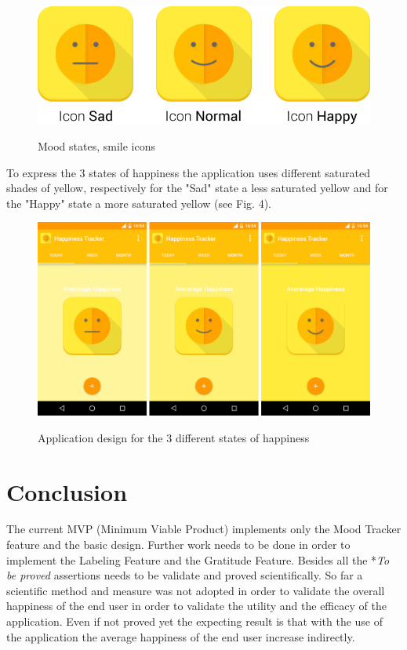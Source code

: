 \documentclass[times]{jtitauth}
\begin{document}
\begin{figure}[H]
\includegraphics[width=\columnwidth]{HappinessTracker-smile-icons}
\label{fig:smile-icons}
\centering
\caption{Mood states, smile icons}
\end{figure}

To express the 3 states of happiness the application uses different saturated shades
of yellow, respectively for the "Sad" state a less saturated yellow and for the
"Happy" state a more saturated yellow (see Fig. 4).

\begin{figure}[H]
\includegraphics[width=\columnwidth]{HappinessTracker-happiness-types}
\label{fig:happiness-types}
\centering
\caption{Application design for the 3 different states of happiness}
\end{figure}

\section*{Conclusion}
The current MVP (Minimum Viable Product) implements only the Mood Tracker feature and the basic design.
Further work needs to be done in order to implement the Labeling Feature and the Gratitude Feature.
Besides all the *\textit{To be proved} assertions needs to be validate and proved scientifically.
So far a scientific method and measure was not adopted in order to validate the overall happiness of the 
end user in order to validate the utility and the efficacy of the application.
Even if not proved yet the expecting result is that with the use of the application the average happiness of the end user increase
indirectly.
\end{document}
